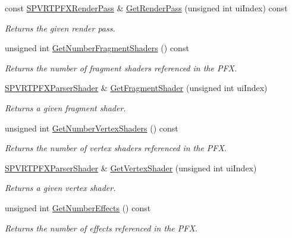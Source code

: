 \begin{DoxyCompactItemize}
const \hyperlink{struct_s_p_v_r_t_p_f_x_render_pass}{S\+P\+V\+R\+T\+P\+F\+X\+Render\+Pass} \& \hyperlink{class_c_p_v_r_t_p_f_x_parser_ad7ad8e5595b6a3280c207861dfa1124b}{Get\+Render\+Pass} (unsigned int ui\+Index) const 
\begin{DoxyCompactList}\small\item\em Returns the given render pass. \end{DoxyCompactList}\item 
unsigned int \hyperlink{class_c_p_v_r_t_p_f_x_parser_af79c075e3cc40f4b0ed44335ce392806}{Get\+Number\+Fragment\+Shaders} () const 
\begin{DoxyCompactList}\small\item\em Returns the number of fragment shaders referenced in the P\+F\+X. \end{DoxyCompactList}\item 
\hyperlink{struct_s_p_v_r_t_p_f_x_parser_shader}{S\+P\+V\+R\+T\+P\+F\+X\+Parser\+Shader} \& \hyperlink{class_c_p_v_r_t_p_f_x_parser_a7d696f2ed86d0fa2b6f1711278843d0d}{Get\+Fragment\+Shader} (unsigned int ui\+Index)
\begin{DoxyCompactList}\small\item\em Returns a given fragment shader. \end{DoxyCompactList}\item 
unsigned int \hyperlink{class_c_p_v_r_t_p_f_x_parser_afa5fa0f40d8aad49b4502b9d77bdd1df}{Get\+Number\+Vertex\+Shaders} () const 
\begin{DoxyCompactList}\small\item\em Returns the number of vertex shaders referenced in the P\+F\+X. \end{DoxyCompactList}\item 
\hyperlink{struct_s_p_v_r_t_p_f_x_parser_shader}{S\+P\+V\+R\+T\+P\+F\+X\+Parser\+Shader} \& \hyperlink{class_c_p_v_r_t_p_f_x_parser_aef3f17e8376b6129abf275a6cb1837ab}{Get\+Vertex\+Shader} (unsigned int ui\+Index)
\begin{DoxyCompactList}\small\item\em Returns a given vertex shader. \end{DoxyCompactList}\item 
unsigned int \hyperlink{class_c_p_v_r_t_p_f_x_parser_ae0e3acfc196a8186c12be71c109818c6}{Get\+Number\+Effects} () const 
\begin{DoxyCompactList}\small\item\em Returns the number of effects referenced in the P\+F\+X. \end{DoxyCompactList}\item 

\end{DoxyCompactItemize}
